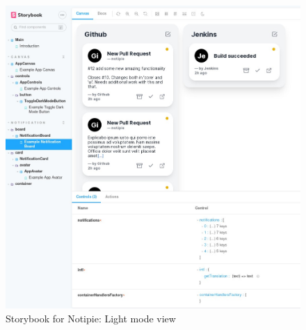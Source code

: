 \begin{figure}[hp]
  \centering
  \includegraphics[width=\linewidth,keepaspectratio]{img/storybook_light.jpg}
  \caption{Storybook for Notipie: Light mode view}
  \label{fig:storybook-light}
\end{figure}
